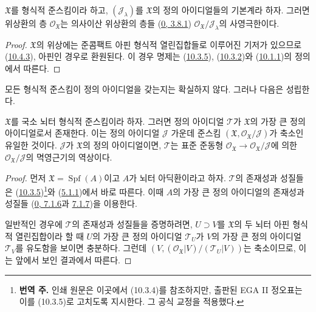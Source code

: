\begin{proposition}[10.5.3]
\label{I.10.5.3-ko}
$\mathfrak{X}$를 형식적 준스킴이라 하고, $(\mathscr{J}_\lambda)$를
$\mathfrak{X}$의 정의 아이디얼들의 기본계라 하자. 그러면 위상환의 층
$\mathscr{O}_{\mathfrak{X}}$는 의사이산 위상환의 층들
(\hyperref[0.3.8.1-ko]{0, 3.8.1})
$\mathscr{O}_{\mathfrak{X}}/\mathscr{J}_\lambda$의 사영극한이다.
\end{proposition}

\begin{proof}
$\mathfrak{X}$의 위상에는 준콤팩트 아핀 형식적 열린집합들로 이루어진
기저가 있으므로(\hyperref[I.10.4.3-ko]{10.4.3}), 아핀인 경우로
환원된다. 이 경우 명제는 (\hyperref[I.10.3.5-ko]{10.3.5}),
(\hyperref[I.10.3.2-ko]{10.3.2})와
(\hyperref[I.10.1.1-ko]{10.1.1})의 정의에서 따른다.
\end{proof}

모든 형식적 준스킴이 정의 아이디얼을 갖는지는 확실하지 않다. 그러나
다음은 성립한다.

\begin{proposition}[10.5.4]
\label{I.10.5.4-ko}
$\mathfrak{X}$를 국소 뇌터 형식적 준스킴이라 하자. 그러면
정의 아이디얼 $\mathscr{T}$가 $\mathfrak{X}$의 가장 큰 정의
아이디얼로서 존재한다. 이는 정의 아이디얼 $\mathscr{J}$ 가운데 준스킴
$(\mathfrak{X},\mathscr{O}_{\mathfrak{X}}/\mathscr{J})$가 축소인
유일한 것이다. $\mathscr{J}$가
$\mathfrak{X}$의 정의 아이디얼이면, $\mathscr{T}$는 표준 준동형
$\mathscr{O}_{\mathfrak{X}}\to
\mathscr{O}_{\mathfrak{X}}/\mathscr{J}$에 의한
$\mathscr{O}_{\mathfrak{X}}/\mathscr{J}$의 멱영근기의 역상이다.
\end{proposition}

\begin{proof}
먼저 $\mathfrak{X}=\operatorname{Spf}(A)$이고 $A$가 뇌터 아딕환이라고
하자. $\mathscr{T}$의 존재성과 성질들은
(\hyperref[I.10.3.5-ko]{10.3.5})\footnote{\textbf{번역 주.} 인쇄 원문은
이곳에서 (10.3.4)를 참조하지만, 출판된 EGA II 정오표는 이를
(10.3.5)로 고치도록 지시한다. 그 공식 교정을 적용했다.}와
(\hyperref[I.5.1.1-ko]{5.1.1})에서 바로 따른다. 이때 $A$의 가장 큰
정의 아이디얼의 존재성과 성질들
(\hyperref[0.7.1.6-ko]{0, 7.1.6}과
\hyperref[0.7.1.7-ko]{7.1.7})을 이용한다.

일반적인 경우에 $\mathscr{T}$의 존재성과 성질들을 증명하려면,
$U\supset V$를 $\mathfrak{X}$의 두 뇌터 아핀 형식적 열린집합이라 할 때
$U$의 가장 큰 정의 아이디얼 $\mathscr{T}_U$가 $V$의 가장 큰 정의
아이디얼 $\mathscr{T}_V$를 유도함을 보이면 충분하다. 그런데
$(V,(\mathscr{O}_{\mathfrak{X}}|V)/(\mathscr{T}_U|V))$는 축소이므로,
이는 앞에서 보인 결과에서 따른다.
\end{proof}

